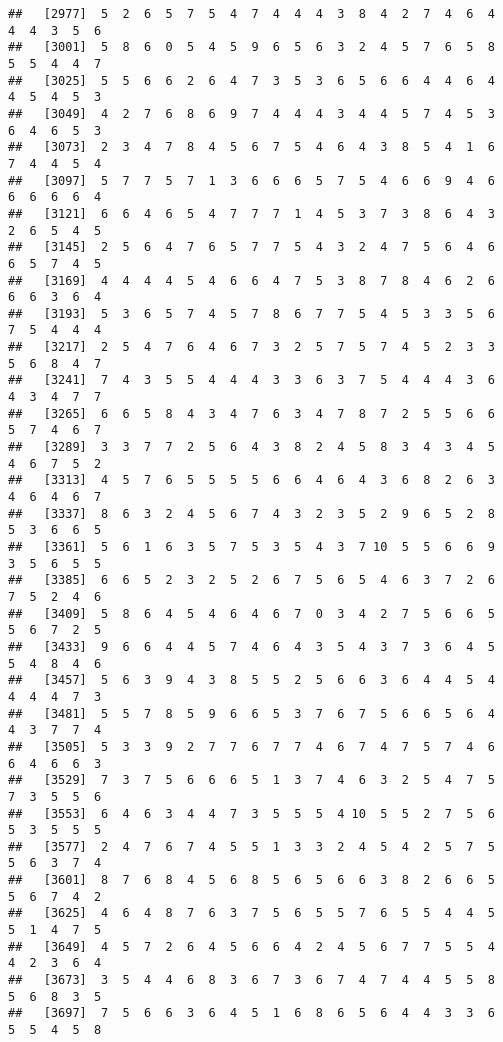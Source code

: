 \documentclass[
]{book}
\begin{document}
\begin{verbatim}
##   [2977]  5  2  6  5  7  5  4  7  4  4  4  3  8  4  2  7  4  6  4  4  4  3  5  6
##   [3001]  5  8  6  0  5  4  5  9  6  5  6  3  2  4  5  7  6  5  8  5  5  4  4  7
##   [3025]  5  5  6  6  2  6  4  7  3  5  3  6  5  6  6  4  4  6  4  4  5  4  5  3
##   [3049]  4  2  7  6  8  6  9  7  4  4  4  3  4  4  5  7  4  5  3  6  4  6  5  3
##   [3073]  2  3  4  7  8  4  5  6  7  5  4  6  4  3  8  5  4  1  6  7  4  4  5  4
##   [3097]  5  7  7  5  7  1  3  6  6  6  5  7  5  4  6  6  9  4  6  6  6  6  6  4
##   [3121]  6  6  4  6  5  4  7  7  7  1  4  5  3  7  3  8  6  4  3  2  6  5  4  5
##   [3145]  2  5  6  4  7  6  5  7  7  5  4  3  2  4  7  5  6  4  6  6  5  7  4  5
##   [3169]  4  4  4  4  5  4  6  6  4  7  5  3  8  7  8  4  6  2  6  6  6  3  6  4
##   [3193]  5  3  6  5  7  4  5  7  8  6  7  7  5  4  5  3  3  5  6  7  5  4  4  4
##   [3217]  2  5  4  7  6  4  6  7  3  2  5  7  5  7  4  5  2  3  3  5  6  8  4  7
##   [3241]  7  4  3  5  5  4  4  4  3  3  6  3  7  5  4  4  4  3  6  4  3  4  7  7
##   [3265]  6  6  5  8  4  3  4  7  6  3  4  7  8  7  2  5  5  6  6  5  7  4  6  7
##   [3289]  3  3  7  7  2  5  6  4  3  8  2  4  5  8  3  4  3  4  5  4  6  7  5  2
##   [3313]  4  5  7  6  5  5  5  5  6  6  4  6  4  3  6  8  2  6  3  4  6  4  6  7
##   [3337]  8  6  3  2  4  5  6  7  4  3  2  3  5  2  9  6  5  2  8  5  3  6  6  5
##   [3361]  5  6  1  6  3  5  7  5  3  5  4  3  7 10  5  5  6  6  9  3  5  6  5  5
##   [3385]  6  6  5  2  3  2  5  2  6  7  5  6  5  4  6  3  7  2  6  7  5  2  4  6
##   [3409]  5  8  6  4  5  4  6  4  6  7  0  3  4  2  7  5  6  6  5  5  6  7  2  5
##   [3433]  9  6  6  4  4  5  7  4  6  4  3  5  4  3  7  3  6  4  5  5  4  8  4  6
##   [3457]  5  6  3  9  4  3  8  5  5  2  5  6  6  3  6  4  4  5  4  4  4  4  7  3
##   [3481]  5  5  7  8  5  9  6  6  5  3  7  6  7  5  6  6  5  6  4  4  3  7  7  4
##   [3505]  5  3  3  9  2  7  7  6  7  7  4  6  7  4  7  5  7  4  6  6  4  6  6  3
##   [3529]  7  3  7  5  6  6  6  5  1  3  7  4  6  3  2  5  4  7  5  7  3  5  5  6
##   [3553]  6  4  6  3  4  4  7  3  5  5  5  4 10  5  5  2  7  5  6  5  3  5  5  5
##   [3577]  2  4  7  6  7  4  5  5  1  3  3  2  4  5  4  2  5  7  5  5  6  3  7  4
##   [3601]  8  7  6  8  4  5  6  8  5  6  5  6  6  3  8  2  6  6  5  5  6  7  4  2
##   [3625]  4  6  4  8  7  6  3  7  5  6  5  5  7  6  5  5  4  4  5  5  1  4  7  5
##   [3649]  4  5  7  2  6  4  5  6  6  4  2  4  5  6  7  7  5  5  4  4  2  3  6  4
##   [3673]  3  5  4  4  6  8  3  6  7  3  6  7  4  7  4  4  5  5  8  5  6  8  3  5
##   [3697]  7  5  6  6  3  6  4  5  1  6  8  6  5  6  4  4  3  3  6  5  5  4  5  8

\end{verbatim}
\end{document}
